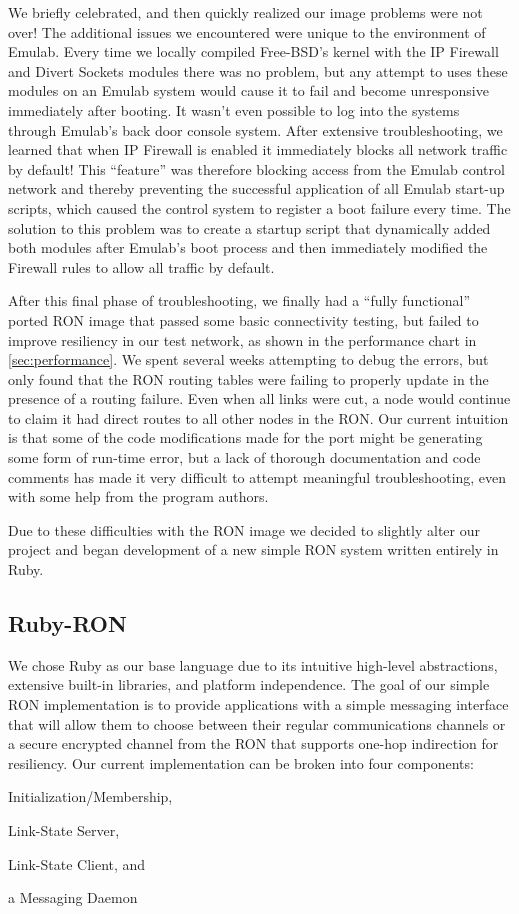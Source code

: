 We briefly celebrated, and then quickly realized our image problems were
not over!  The additional issues we encountered were unique to the
environment of Emulab.  Every time we locally compiled Free-BSD's kernel
with the IP Firewall and Divert Sockets modules there was no problem, but
any attempt to uses these modules on an Emulab system would cause it to
fail and become unresponsive immediately after booting.  It wasn't even
possible to log into the systems through Emulab's back door console system.
After extensive troubleshooting, we learned that when IP Firewall is
enabled it immediately blocks all network traffic by default!  This
``feature'' was therefore blocking access from the Emulab control network
and thereby preventing the successful application of all Emulab start-up
scripts, which caused the control system to register a boot failure every
time.  The solution to this problem was to create a startup script that
dynamically added both modules after Emulab's boot process and then
immediately modified the Firewall rules to allow all traffic by default.

After this final phase of troubleshooting, we finally had a ``fully
functional'' ported RON image that passed some basic connectivity testing,
but failed to improve resiliency in our test network, as shown in the
performance chart in \cref{sec:performance}.  We spent several weeks
attempting to debug the errors, but only found that the RON routing tables
were failing to properly update in the presence of a routing failure.  Even
when all links were cut, a node would continue to claim it had direct
routes to all other nodes in the RON.  Our current intuition is that some
of the code modifications made for the port might be generating some form
of run-time error, but a lack of thorough documentation and code comments
has made it very difficult to attempt meaningful troubleshooting, even with
some help from the program authors.

Due to these difficulties with the RON image we decided to slightly alter
our project and began development of a new simple RON system written
entirely in Ruby.


\subsection{Ruby-RON}
\label{sec:ruby-ron}

We chose Ruby as our base language due to its intuitive high-level
abstractions, extensive built-in libraries, and platform independence.  The
goal of our simple RON implementation is to provide applications with a
simple messaging interface that will allow them to choose between their
regular communications channels or a secure encrypted channel from the RON
that supports one-hop indirection for resiliency.  Our current
implementation can be broken into four components:
\begin{inparaenum}[(a)]
\item Initialization/Membership,
\item Link-State Server,
\item Link-State Client, and
\item a Messaging Daemon
\end{inparaenum}

